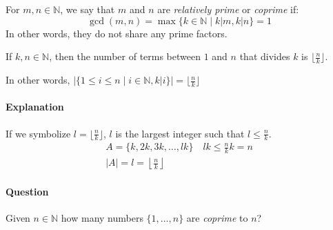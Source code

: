 \documentclass[00_complete]{subfiles}
\begin{document}
\begin{definition}
    For $m,n \in \mathbb{N}$, we say that $m$ and $n$ are \emph{relatively
    prime} or \emph{coprime} if:
    $$\gcd(m,n)=\max\{k \in \mathbb{N}\mid k|m, k|n\} = 1$$
    In other words, they do not share any prime factors.
\end{definition}

\begin{claim}
   If $k,n \in \mathbb{N}$, then the number of terms between $1$ and $n$ that
   divides $k$ is $\lfloor\frac{n}{k}\rfloor$.

   In other words, $|\{1 \leq i \leq n \mid i \in \mathbb{N},
   k|i\}|=\lfloor\frac{n}{k}\rfloor$
\end{claim}

\paragraph{Explanation}

If we symbolize $l=\lfloor\frac{n}{k}\rfloor$, $l$ is the largest integer such
that $l \leq \frac{n}{k}$.
\begin{gather*}
    A=\{k,2k,3k,\dots,lk\} \quad lk \leq \frac{n}{k}k=n \\
    |A|=l=\left\lfloor\frac{n}{k}\right\rfloor
\end{gather*}

\paragraph{Question}

Given $n \in \mathbb{N}$ how many numbers $\{1,\dots,n\}$ are \emph{coprime} to
$n$?
\end{document}
